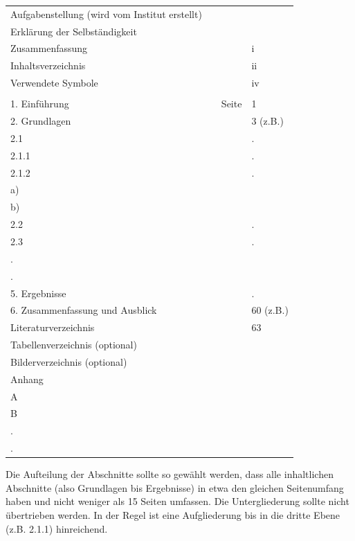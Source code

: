 \begin{tabular}{lcll}
	Aufgabenstellung (wird vom Institut erstellt)   &\hspace{3cm} & &\\
	Erklärung der Selbständigkeit &&&\\
	Zusammenfassung &  & &i \\
	Inhaltsverzeichnis & && ii\\
	Verwendete Symbole& & &iv\\
	\\
	1. Einführung & &Seite& 1 \\
	2. Grundlagen&&& 3 (z.B.)\\
	\hspace{5mm} 2.1 & & &.       \\
	\hspace{10mm} 2.1.1& & &. \\
	\hspace{10mm} 2.1.2& & &.\\
	\hspace{20mm} a)\\
	\hspace{20mm} b)\\
	\hspace{5mm} 2.2& & &.\\
	\hspace{5mm} 2.3& & &.\\
	.\\
	.\\
	5. Ergebnisse& & &.\\
	6. Zusammenfassung und Ausblick&&& 60 (z.B.)\\
	Literaturverzeichnis &&&63\\
	Tabellenverzeichnis (optional)\\
	Bilderverzeichnis (optional)\\
	Anhang\\
	A\\
	B\\
	.\\
	.\\
\end{tabular}


Die Aufteilung der Abschnitte sollte so gewählt werden, dass alle inhaltlichen Abschnitte (also
Grundlagen bis Ergebnisse) in etwa den gleichen Seitenumfang haben und nicht weniger als 15 Seiten
umfassen. Die Untergliederung sollte nicht übertrieben werden. In der Regel ist eine Aufgliederung
bis in die dritte Ebene (z.B. 2.1.1) hinreichend.




